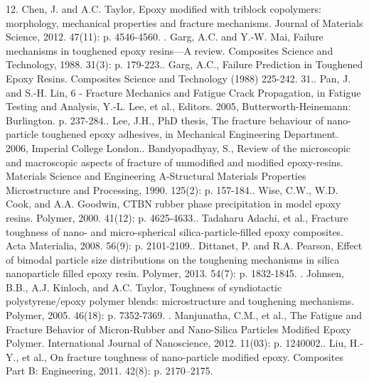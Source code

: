 \documentclass[numbers=noendperiod,chapterprefix=on]{icldt} %
\begin{document}
12.	Chen, J. and A.C. Taylor, Epoxy modified with triblock copolymers: morphology, mechanical properties and fracture mechanisms. Journal of Materials Science, 2012. 47(11): p. 4546-4560.
.	Garg, A.C. and Y.-W. Mai, Failure mechanisms in toughened epoxy resins—A review. Composites Science and Technology, 1988. 31(3): p. 179-223..	Garg, A.C., Failure Prediction in Toughened Epoxy Resins. Composites Science and Technology (1988) 225-242. 31..	Pan, J. and S.-H. Lin, 6 - Fracture Mechanics and Fatigue Crack Propagation, in Fatigue Testing and Analysis, Y.-L. Lee, et al., Editors. 2005, Butterworth-Heinemann: Burlington. p. 237-284..	Lee, J.H., PhD thesis, The fracture behaviour of nano-particle toughened epoxy adhesives, in Mechanical Engineering Department. 2006, Imperial College London..	Bandyopadhyay, S., Review of the microscopic and macroscopic aspects of fracture of unmodified and modified epoxy-resins. Materials Science and Engineering A-Structural Materials Properties Microstructure and Processing, 1990. 125(2): p. 157-184..	Wise, C.W., W.D. Cook, and A.A. Goodwin, CTBN rubber phase precipitation in model epoxy resins. Polymer, 2000. 41(12): p. 4625-4633..	Tadaharu Adachi, et al., Fracture toughness of nano- and micro-spherical silica-particle-filled epoxy composites. Acta Materialia, 2008. 56(9): p. 2101-2109..	Dittanet, P. and R.A. Pearson, Effect of bimodal particle size distributions on the toughening mechanisms in silica nanoparticle filled epoxy resin. Polymer, 2013. 54(7): p. 1832-1845.
.	Johnsen, B.B., A.J. Kinloch, and A.C. Taylor, Toughness of syndiotactic polystyrene/epoxy polymer blends: microstructure and toughening mechanisms. Polymer, 2005. 46(18): p. 7352-7369.
.	Manjunatha, C.M., et al., The Fatigue and Fracture Behavior of Micron-Rubber and Nano-Silica Particles Modified Epoxy Polymer. International Journal of Nanoscience, 2012. 11(03): p. 1240002..	Liu, H.-Y., et al., On fracture toughness of nano-particle modified epoxy. Composites Part B: Engineering, 2011. 42(8): p. 2170–2175.\newline
\end{document}
